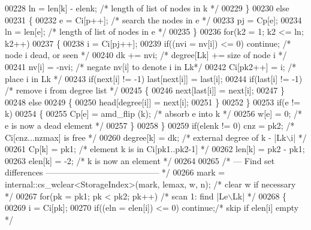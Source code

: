\begin{DoxyCode}
00228         ln = len[k] - elenk;      \textcolor{comment}{/* length of list of nodes in k */}
00229       \}
00230       \textcolor{keywordflow}{else}
00231       \{
00232         e = Ci[p++];              \textcolor{comment}{/* search the nodes in e */}
00233         pj = Cp[e];
00234         ln = len[e];              \textcolor{comment}{/* length of list of nodes in e */}
00235       \}
00236       \textcolor{keywordflow}{for}(k2 = 1; k2 <= ln; k2++)
00237       \{
00238         i = Ci[pj++];
00239         \textcolor{keywordflow}{if}((nvi = nv[i]) <= 0) \textcolor{keywordflow}{continue}; \textcolor{comment}{/* node i dead, or seen */}
00240         dk += nvi;                 \textcolor{comment}{/* degree[Lk] += size of node i */}
00241         nv[i] = -nvi;             \textcolor{comment}{/* negate nv[i] to denote i in Lk*/}
00242         Ci[pk2++] = i;            \textcolor{comment}{/* place i in Lk */}
00243         \textcolor{keywordflow}{if}(next[i] != -1) last[next[i]] = last[i];
00244         \textcolor{keywordflow}{if}(last[i] != -1)         \textcolor{comment}{/* remove i from degree list */}
00245         \{
00246           next[last[i]] = next[i];
00247         \}
00248         \textcolor{keywordflow}{else}
00249         \{
00250           head[degree[i]] = next[i];
00251         \}
00252       \}
00253       \textcolor{keywordflow}{if}(e != k)
00254       \{
00255         Cp[e] = amd\_flip (k);      \textcolor{comment}{/* absorb e into k */}
00256         w[e] = 0;                 \textcolor{comment}{/* e is now a dead element */}
00257       \}
00258     \}
00259     \textcolor{keywordflow}{if}(elenk != 0) cnz = pk2;         \textcolor{comment}{/* Ci[cnz...nzmax] is free */}
00260     degree[k] = dk;                   \textcolor{comment}{/* external degree of k - |Lk\(\backslash\)i| */}
00261     Cp[k] = pk1;                      \textcolor{comment}{/* element k is in Ci[pk1..pk2-1] */}
00262     len[k] = pk2 - pk1;
00263     elen[k] = -2;                     \textcolor{comment}{/* k is now an element */}
00264     
00265     \textcolor{comment}{/* --- Find set differences ----------------------------------------- */}
00266     mark = internal::cs\_wclear<StorageIndex>(mark, lemax, w, n);  \textcolor{comment}{/* clear w if necessary */}
00267     \textcolor{keywordflow}{for}(pk = pk1; pk < pk2; pk++)    \textcolor{comment}{/* scan 1: find |Le\(\backslash\)Lk| */}
00268     \{
00269       i = Ci[pk];
00270       \textcolor{keywordflow}{if}((eln = elen[i]) <= 0) \textcolor{keywordflow}{continue};\textcolor{comment}{/* skip if elen[i] empty */}

\end{DoxyCode}
